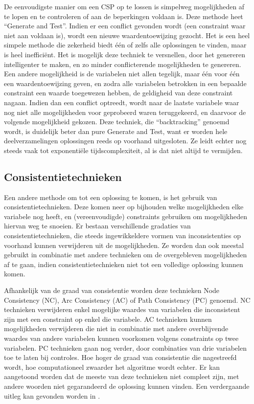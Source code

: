 De eenvoudigste manier om een CSP op te lossen is simpelweg mogelijkheden af te lopen en te controleren of aan de beperkingen voldaan is. Deze methode heet ``Generate and Test''. Indien er een conflict gevonden wordt (een constraint waar niet aan voldaan is), wordt een nieuwe waardentoewijzing gezocht.
Het is een heel simpele methode die zekerheid biedt \'e\'en of zelfs alle oplossingen te vinden, maar is heel ineffici\"ent. Het is mogelijk deze techniek te versnellen, door het genereren intelligenter te maken, en zo minder conflicterende mogelijkheden te genereren. Een andere mogelijkheid is de variabelen niet allen tegelijk, maar \'e\'en voor \'e\'en een waardentoewijzing geven, en zodra alle variabelen betrokken in een bepaalde constraint een waarde toegewezen hebben, de geldigheid van deze constraint nagaan. Indien dan een conflict optreedt, wordt naar de laatste variabele waar nog niet alle mogelijkheden voor geprobeerd waren teruggekeerd, en daarvoor de volgende mogelijkheid gekozen. Deze techniek, die ``backtracking'' genoemd wordt, is duidelijk beter dan pure Generate and Test, want er worden hele deelverzamelingen oplossingen reeds op voorhand uitgesloten. Ze leidt echter nog steeds vaak tot exponenti\"ele tijdscomplexiteit, al is dat niet altijd te vermijden.

\subsection{Consistentietechnieken}

Een andere methode om tot een oplossing te komen, is het gebruik van consistentietechnieken. Deze komen neer op bijhouden welke mogelijkheden elke variabele nog heeft, en (vereenvoudigde) constraints gebruiken om mogelijkheden hiervan weg te snoeien. Er bestaan verschillende gradaties van consistentietechnieken, die steeds ingewikkeldere vormen van inconsistenties op voorhand kunnen verwijderen uit de mogelijkheden. Ze worden dan ook meestal gebruikt in combinatie met andere technieken om de overgebleven mogelijkheden af te gaan, indien consistentietechnieken niet tot een volledige oplossing kunnen komen.

Afhankelijk van de graad van consistentie worden deze technieken Node Consistency (NC), Arc Consistency (AC) of Path Consistency (PC) genoemd. NC technieken verwijderen enkel mogelijke waardes van variabelen die inconsistent zijn met een constraint op enkel die variabele. AC technieken kunnen mogelijkheden verwijderen die niet in combinatie met andere overblijvende waardes van andere variabelen kunnen voorkomen volgens constraints op twee variabelen. PC technieken gaan nog verder, door combinaties van drie variabelen toe te laten bij controles. Hoe hoger de graad van consistentie die nagestreefd wordt, hoe computationeel zwaarder het algoritme wordt echter. Er kan aangetoond worden dat de meeste van deze technieken niet compleet zijn, met andere woorden niet gegarandeerd de oplossing kunnen vinden. Een verdergaande uitleg kan gevonden worden in \cite{bartak01}. 

